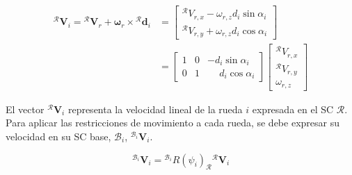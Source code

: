 \documentclass[11pt,a4paper]{article}
\newcommand{\vect}[1]{\bm{#1}}       %
\newcommand{\frameR}{\mathcal{R}}
\newcommand{\frameBi}{\mathcal{B}_i}
\begin{document}
\begin{equation}
    \begin{aligned}
        {}^\frameR \vect{V}_{i}
        = {}^\frameR \vect{V}_r + \boldsymbol{\omega}_r \times {}^\frameR \vect{d}_i & = \begin{bmatrix}
                                                                                             {}^\frameR V_{r,x} - \omega_{r,z} d_{i} \sin\alpha_i \\
                                                                                             {}^\frameR V_{r,y} + \omega_{r,z} d_{i} \cos\alpha_i
                                                                                         \end{bmatrix} \\
                                                                                     & = \begin{bmatrix}
                                                                                             1 & 0 & -d_{i} \sin\alpha_i           \\
                                                                                             0 & 1 & \phantom{-}d_{i} \cos\alpha_i
                                                                                         \end{bmatrix} \begin{bmatrix}
                                                                                                           {}^\frameR V_{r,x} \\
                                                                                                           {}^\frameR V_{r,y} \\
                                                                                                           \omega_{r,z}
                                                                                                       \end{bmatrix}
    \end{aligned}
    \label{eq:wheel-velocity-expanded}
\end{equation}

El vector \({}^\frameR \vect{V}_{i}\) representa la velocidad lineal de la rueda \(i\) expresada en el SC \(\frameR\).
Para aplicar las restricciones de movimiento a cada rueda, se debe expresar su velocidad en su SC base, \(\frameBi\), \({}^{\frameBi} \vect{V}_{i}\).

\begin{equation}
    {}^{\frameBi} \vect{V}_{i} = {}^{\frameBi} R(\psi_i)_{\frameR} {}^\frameR \vect{V}_{i}
    \label{eq:vwheel-transform}
\end{equation}
\end{document}

